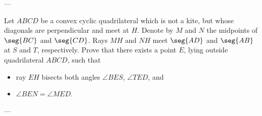 
---

Let $ABCD$ be a convex cyclic quadrilateral which is not a kite, but whose diagonals are perpendicular and meet at $H$. Denote by $M$ and $N$ the midpoints of $\seg{BC}$ and $\seg{CD}$. Rays $MH$ and $NH$ meet $\seg{AD}$ and $\seg{AB}$ at $S$ and $T$, respectively. Prove that there exists a point $E$, lying outside quadrilateral $ABCD$, such that
\begin{itemize}[itemsep=0em]
    \item ray $EH$ bisects both angles $\angle BES$, $\angle TED$, and
    \item $\angle BEN=\angle MED$.
\end{itemize}

---

